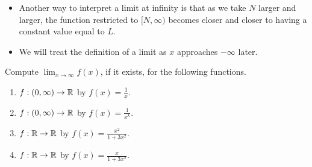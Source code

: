 \begin{tcolorbox}[colback=mylightblue, title = {\bf Finite Limits at $\infty$}, breakable]
\begin{itemize}
    \item Another way to interpret a limit at infinity is that as we take $N$ larger and larger, the function restricted to $[N, \infty)$ becomes closer and closer to having a constant value equal to $L$.

    \item We will treat the definition of a limit as $x$ approaches $-\infty$ later.  
\end{itemize}


\end{tcolorbox}

\bigskip

 
\begin{example} 
\label{ex:LimitAtPlusInfinity}
Compute $\displaystyle \lim_{x \to \infty} f(x)$, if it exists, for the following functions. 

\begin{enumerate}
\renewcommand{\labelenumi}{(\alph{enumi})}
\setlength{\itemsep}{.2cm}
    \item $f:(0,\infty) \to \mathbb R$ by $f(x) = \frac{1}{x}$.
        
    \item $f:(0,\infty) \to \mathbb R$ by $f(x) = \frac{1}{x^k}$.
    
    \item $f:\mathbb R \to \mathbb R$ by $f(x) = \frac{x^2}{1 + 3 x^2}$.
     
     \item $f:\mathbb R \to \mathbb R$ by $f(x) = \frac{x}{1 + 3 x^2}$.


\end{enumerate} 

   
\end{example}

